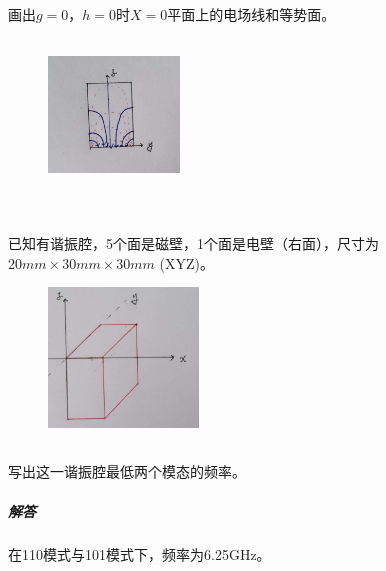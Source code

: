 \documentclass[UTF8]{ctexart}
\begin{document}
\subsection{}
\paragraph{}
画出$g=0$，$h=0$时$X=0$平面上的电场线和等势面。
\begin{figure}[htbp]
\centering
\includegraphics[width=3.5cm,height=4cm]{2019-3.jpg}
\end{figure}
\section{}
\paragraph{}
已知有谐振腔，5个面是磁壁，1个面是电壁（右面），尺寸为$20mm\times 30mm\times30mm$ (XYZ)。
\begin{figure}
\includegraphics[width=4cm]{2019-4.jpg}
\end{figure}
\subsection{}
\paragraph{}
写出这一谐振腔最低两个模态的频率。
\subparagraph{解答}
在110模式与101模式下，频率为6.25GHz。
\subsection{}
\end{document}
